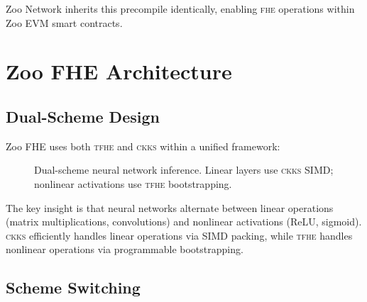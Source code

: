 \documentclass[11pt,letterpaper]{article}
\newcommand{\FHE}{\textsc{fhe}}
\newcommand{\TFHE}{\textsc{tfhe}}
\newcommand{\CKKS}{\textsc{ckks}}
\begin{document}
Zoo Network inherits this precompile identically, enabling \FHE{} operations within Zoo EVM smart contracts.

\section{Zoo FHE Architecture}
\label{sec:architecture}

\subsection{Dual-Scheme Design}

Zoo FHE uses both \TFHE{} and \CKKS{} within a unified framework:

\begin{figure}[t]
\centering
{}
\caption{Dual-scheme neural network inference. Linear layers use \CKKS{} SIMD; nonlinear activations use \TFHE{} bootstrapping.}
\label{fig:dual-scheme}
\end{figure}

The key insight is that neural networks alternate between linear operations (matrix multiplications, convolutions) and nonlinear activations (ReLU, sigmoid). \CKKS{} efficiently handles linear operations via SIMD packing, while \TFHE{} handles nonlinear operations via programmable bootstrapping.

\subsection{Scheme Switching}
\end{document}
